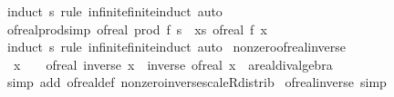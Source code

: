 \begin{isabellebody}
%
\isatagproof
{}\isamarkupfalse%
\ {\isacharparenleft}{\kern0pt}induct\ s\ rule{\isacharcolon}{\kern0pt}\ infinite{\isacharunderscore}{\kern0pt}finite{\isacharunderscore}{\kern0pt}induct{\isacharparenright}{\kern0pt}\ auto%
\endisatagproof
{\isafoldproof}%
%
\isadelimproof
\isanewline
%
\endisadelimproof
\isanewline
{}\isamarkupfalse%
\ of{\isacharunderscore}{\kern0pt}real{\isacharunderscore}{\kern0pt}prod{\isacharbrackleft}{\kern0pt}simp{\isacharbrackright}{\kern0pt}{\isacharcolon}{\kern0pt}\ {\isachardoublequoteopen}of{\isacharunderscore}{\kern0pt}real\ {\isacharparenleft}{\kern0pt}prod\ f\ s{\isacharparenright}{\kern0pt}\ {\isacharequal}{\kern0pt}\ {\isacharparenleft}{\kern0pt}{\isasymProd}x{\isasymin}s{\isachardot}{\kern0pt}\ of{\isacharunderscore}{\kern0pt}real\ {\isacharparenleft}{\kern0pt}f\ x{\isacharparenright}{\kern0pt}{\isacharparenright}{\kern0pt}{\isachardoublequoteclose}\isanewline
%
\isadelimproof
\ \ %
\endisadelimproof
%
\isatagproof
{}\isamarkupfalse%
\ {\isacharparenleft}{\kern0pt}induct\ s\ rule{\isacharcolon}{\kern0pt}\ infinite{\isacharunderscore}{\kern0pt}finite{\isacharunderscore}{\kern0pt}induct{\isacharparenright}{\kern0pt}\ auto%
\endisatagproof
{\isafoldproof}%
%
\isadelimproof
\isanewline
%
\endisadelimproof
\isanewline
{}\isamarkupfalse%
\ nonzero{\isacharunderscore}{\kern0pt}of{\isacharunderscore}{\kern0pt}real{\isacharunderscore}{\kern0pt}inverse{\isacharcolon}{\kern0pt}\isanewline
\ \ {\isachardoublequoteopen}x\ {\isasymnoteq}\ {}\ {\isasymLongrightarrow}\ of{\isacharunderscore}{\kern0pt}real\ {\isacharparenleft}{\kern0pt}inverse\ x{\isacharparenright}{\kern0pt}\ {\isacharequal}{\kern0pt}\ inverse\ {\isacharparenleft}{\kern0pt}of{\isacharunderscore}{\kern0pt}real\ x\ {\isacharcolon}{\kern0pt}{\isacharcolon}{\kern0pt}\ {\isacharprime}{\kern0pt}a{\isacharcolon}{\kern0pt}{\isacharcolon}{\kern0pt}real{\isacharunderscore}{\kern0pt}div{\isacharunderscore}{\kern0pt}algebra{\isacharparenright}{\kern0pt}{\isachardoublequoteclose}\isanewline
%
\isadelimproof
\ \ %
\endisadelimproof
%
\isatagproof
{}\isamarkupfalse%
\ {\isacharparenleft}{\kern0pt}simp\ add{\isacharcolon}{\kern0pt}\ of{\isacharunderscore}{\kern0pt}real{\isacharunderscore}{\kern0pt}def\ nonzero{\isacharunderscore}{\kern0pt}inverse{\isacharunderscore}{\kern0pt}scaleR{\isacharunderscore}{\kern0pt}distrib{\isacharparenright}{\kern0pt}%
\endisatagproof
{\isafoldproof}%
%
\isadelimproof
\isanewline
%
\endisadelimproof
\isanewline
{}\isamarkupfalse%
\ of{\isacharunderscore}{\kern0pt}real{\isacharunderscore}{\kern0pt}inverse\ {\isacharbrackleft}{\kern0pt}simp{\isacharbrackright}{\kern0pt}{\isacharcolon}{\kern0pt}\isanewline

\end{isabellebody}
